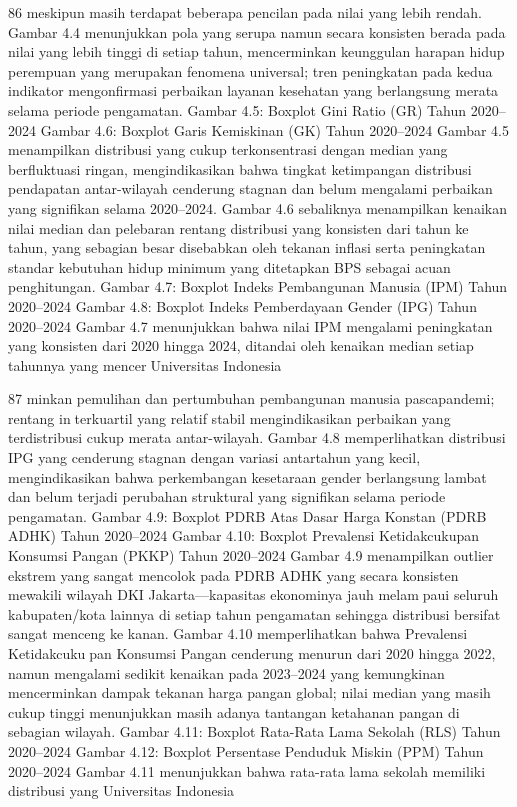 86
meskipun masih terdapat beberapa pencilan pada nilai yang lebih rendah. Gambar 4.4
menunjukkan pola yang serupa namun secara konsisten berada pada nilai yang lebih tinggi
di setiap tahun, mencerminkan keunggulan harapan hidup perempuan yang merupakan
fenomena universal; tren peningkatan pada kedua indikator mengonfirmasi perbaikan
layanan kesehatan yang berlangsung merata selama periode pengamatan.
Gambar 4.5: Boxplot Gini Ratio (GR)
Tahun 2020–2024
Gambar 4.6: Boxplot Garis Kemiskinan
(GK) Tahun 2020–2024
Gambar 4.5 menampilkan distribusi yang cukup terkonsentrasi dengan median yang
berfluktuasi ringan, mengindikasikan bahwa tingkat ketimpangan distribusi pendapatan
antar-wilayah cenderung stagnan dan belum mengalami perbaikan yang signifikan selama
2020–2024. Gambar 4.6 sebaliknya menampilkan kenaikan nilai median dan pelebaran
rentang distribusi yang konsisten dari tahun ke tahun, yang sebagian besar disebabkan oleh
tekanan inflasi serta peningkatan standar kebutuhan hidup minimum yang ditetapkan BPS
sebagai acuan penghitungan.
Gambar 4.7: Boxplot Indeks Pembangunan
Manusia (IPM) Tahun 2020–2024
Gambar 4.8: Boxplot Indeks
Pemberdayaan Gender (IPG) Tahun
2020–2024
Gambar 4.7 menunjukkan bahwa nilai IPM mengalami peningkatan yang konsisten
dari 2020 hingga 2024, ditandai oleh kenaikan median setiap tahunnya yang mencerUniversitas Indonesia

87
minkan pemulihan dan pertumbuhan pembangunan manusia pascapandemi; rentang interkuartil yang relatif stabil mengindikasikan perbaikan yang terdistribusi cukup merata
antar-wilayah. Gambar 4.8 memperlihatkan distribusi IPG yang cenderung stagnan dengan
variasi antartahun yang kecil, mengindikasikan bahwa perkembangan kesetaraan gender
berlangsung lambat dan belum terjadi perubahan struktural yang signifikan selama periode
pengamatan.
Gambar 4.9: Boxplot PDRB Atas Dasar
Harga Konstan (PDRB ADHK) Tahun
2020–2024
Gambar 4.10: Boxplot Prevalensi
Ketidakcukupan Konsumsi Pangan (PKKP)
Tahun 2020–2024
Gambar 4.9 menampilkan outlier ekstrem yang sangat mencolok pada PDRB ADHK
yang secara konsisten mewakili wilayah DKI Jakarta—kapasitas ekonominya jauh melampaui seluruh kabupaten/kota lainnya di setiap tahun pengamatan sehingga distribusi bersifat
sangat menceng ke kanan. Gambar 4.10 memperlihatkan bahwa Prevalensi Ketidakcukupan Konsumsi Pangan cenderung menurun dari 2020 hingga 2022, namun mengalami
sedikit kenaikan pada 2023–2024 yang kemungkinan mencerminkan dampak tekanan
harga pangan global; nilai median yang masih cukup tinggi menunjukkan masih adanya
tantangan ketahanan pangan di sebagian wilayah.
Gambar 4.11: Boxplot Rata-Rata Lama
Sekolah (RLS) Tahun 2020–2024
Gambar 4.12: Boxplot Persentase
Penduduk Miskin (PPM) Tahun 2020–2024
Gambar 4.11 menunjukkan bahwa rata-rata lama sekolah memiliki distribusi yang
Universitas Indonesia

